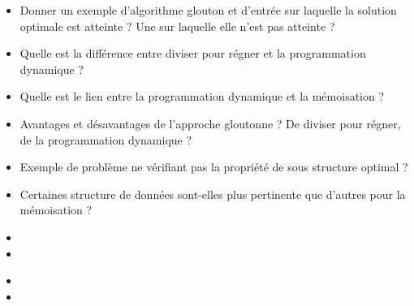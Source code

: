 \documentclass{agregfiche}
\begin{document}
\secquestionsclassiques

\begin{itemize}
    \item Donner un exemple d'algorithme glouton et d'entrée sur laquelle la solution optimale est atteinte ? Une sur laquelle elle n'est pas atteinte ?
    \item Quelle est la différence entre diviser pour régner et la programmation dynamique ?
    \item Quelle est le lien entre la programmation dynamique et la mémoisation ?
    \item Avantages et désavantages de l'approche gloutonne ? De diviser pour régner, de la programmation dynamique ?
    \item Exemple de problème ne vérifiant pas la propriété de sous structure optimal ?
    \item Certaines structure de données sont-elles plus pertinente que d'autres pour la mémoisation ?
\end{itemize}

\secreferences

\begin{itemize}
    \item 
    \item 
\end{itemize}

\secdev

\begin{itemize}
    \item 
    \item 
\end{itemize}
\end{document}
